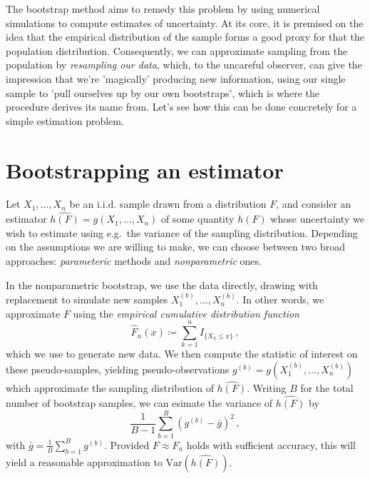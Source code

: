 \documentclass[a4paper]{book}
\begin{document}
The bootstrap method aims to remedy this problem by using numerical simulations to compute estimates of uncertainty. At its core, it is premised on the idea that the empirical distribution of the sample forms a good proxy for that the population distribution. Consequently, we can approximate sampling from the population by \emph{resampling our data}, which, to the uncareful observer, can give the impression that we're 'magically' producing new information, using our single sample to 'pull ourselves up by our own bootstraps', which is where the procedure derives its name from. Let's see how this can be done concretely for a simple estimation problem.

\section{Bootstrapping an estimator}

Let $X_1, \dots, X_n$ be an i.i.d. sample drawn from a distribution $F$, and consider an estimator $\widehat{h(F)} = g(X_1, \dots, X_n)$ of some quantity $h(F)$ whose uncertainty we wish to estimate using e.g.\ the variance of the sampling distribution. Depending on the assumptions we are willing to make, we can choose between two broad approaches: \emph{parameteric} methods and \emph{nonparametric} ones.

In the nonparametric bootstrap, we use the data directly, drawing with replacement to simulate new samples $X^{(b)}_1, \dots, X^{(b)}_n$. In other words, we approximate $F$ using the \emph{empirical cumulative distribution function}
\begin{equation}
  \widehat{F}_n(x) \coloneqq \sum_{k=1}^n I_{\{ X_k \leq x \}} \,,
\end{equation}
which we use to generate new data. We then compute the statistic of interest on these pseudo-samples, yielding pseudo-observations $g^{(b)} = g(X^{(b)}_1, \dots, X^{(b)}_n)$ which approximate the sampling distribution of $\widehat{h(F)}$. Writing $B$ for the total number of bootstrap samples, we can esimate the variance of $\widehat{h(F)}$ by
\begin{equation}
  \frac{1}{B-1}\sum_{b=1}^B(g^{(b)} - \bar{g})^2 \,,
\end{equation}
with $\bar{g} = \frac{1}{B} \sum_{b=1}^B g^{(b)}$. Provided $F \approx \widehat{F}_n$ holds with sufficient accuracy, this will yield a reasonable approximation to $\mathrm{Var}(\widehat{h(F)})$.
\end{document}
